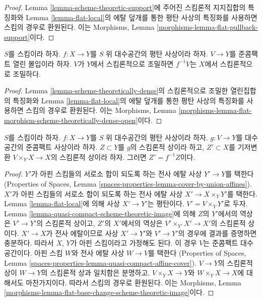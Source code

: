 \begin{proof}
Lemma \ref{lemma-scheme-theoretic-support}에 주어진 스킴론적 지지집합의
특징화와 Lemma \ref{lemma-flat-local}의 에탈 덮개를 통한 평탄 사상의
특징화를 사용하면 스킴의 경우로 환원된다. 이는 Morphisms, Lemma
\ref{morphisms-lemma-flat-pullback-support}이다.
\end{proof}

\begin{lemma}
\label{lemma-flat-morphism-scheme-theoretically-dense-open}
$S$를 스킴이라 하자.
$f : X \to Y$를 $S$ 위 대수공간의 평탄 사상이라 하자.
$V \to Y$를 준콤팩트 열린 몰입이라 하자. $V$가 $Y$에서
스킴론적으로 조밀하면 $f^{-1}V$는 $X$에서 스킴론적으로 조밀하다.
\end{lemma}

\begin{proof}
Lemma \ref{lemma-scheme-theoretically-dense}의 스킴론적으로 조밀한
열린집합의 특징화와 Lemma \ref{lemma-flat-local}의 에탈 덮개를 통한
평탄 사상의 특징화를 사용하면 스킴의 경우로 환원된다. 이는
Morphisms, Lemma
\ref{morphisms-lemma-flat-morphism-scheme-theoretically-dense-open}이다.
\end{proof}

\begin{lemma}
\label{lemma-flat-base-change-scheme-theoretic-image}
$S$를 스킴이라 하자. $f : X \to Y$를 $S$ 위 대수공간의 평탄
사상이라 하자. $g : V \to Y$를 대수공간의 준콤팩트 사상이라 하자.
$Z \subset Y$를 $g$의 스킴론적 상이라 하고, $Z' \subset X$를
기저변환 $V \times_Y X \to X$의 스킴론적 상이라 하자.
그러면 $Z' = f^{-1}Z$이다.
\end{lemma}

\begin{proof}
$Y'$가 아핀 스킴들의 서로소 합이 되도록 하는 전사 에탈 사상
$Y' \to Y$를 택한다(Properties of Spaces, Lemma
\ref{spaces-properties-lemma-cover-by-union-affines}).
$X'$가 아핀 스킴들의 서로소 합이 되도록 하는 전사 에탈 사상
$X' \to X \times_Y Y'$를 택한다.
Lemma \ref{lemma-flat-local}에 의해 사상 $X' \to Y'$는 평탄이다.
$V' = V \times_Y Y'$로 두자.
Lemma \ref{lemma-quasi-compact-scheme-theoretic-image}에 의해
$Z$의 $Y'$에서의 역상은 $V' \to Y'$의 스킴론적 상이고,
$Z'$의 $X'$에서의 역상은
$V' \times_{Y'} X' \to X'$의 스킴론적 상이다.
$X' \to X$가 전사 에탈이므로 사상 $X' \to Y'$와
$V' \to Y'$의 경우에 결과를 증명하면 충분하다.
따라서 $X$, $Y$가 아핀 스킴이라고 가정해도 된다.
이 경우 $V$는 준콤팩트 대수공간이다.
아핀 스킴 $W$와 전사 에탈 사상 $W \to V$를 택한다
(Properties of Spaces, Lemma
\ref{spaces-properties-lemma-quasi-compact-affine-cover}).
$V \to Y$의 스킴론적 상이 $W \to Y$의 스킴론적 상과 일치함은
분명하고, $V \times_Y X \to Y$와 $W \times_Y X \to X$에
대해서도 마찬가지이다. 따라서 스킴의 경우로 환원된다. 이는
Morphisms, Lemma
\ref{morphisms-lemma-flat-base-change-scheme-theoretic-image}이다.
\end{proof}

